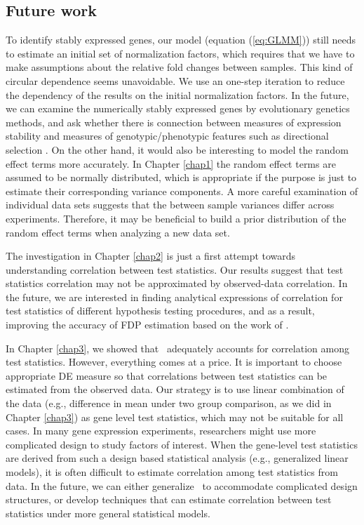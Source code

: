 \subsection{Future work}
To identify stably expressed genes, our model (equation (\ref{eq:GLMM})) still needs to estimate an 
initial set of normalization factors, which requires that we have to make assumptions about the 
relative fold changes between samples. This kind of circular dependence seems unavoidable. We use 
an one-step iteration to reduce the dependency of the results on the initial normalization factors. 
In the future, we can examine the numerically stably expressed genes by evolutionary genetics 
methods, and ask whether there is connection between measures of expression stability and measures 
of genotypic/phenotypic features such as directional selection \citep{sabeti2006positive}.
On the other hand, it would also be interesting to model the random effect terms more accurately. 
In Chapter \ref{chap1} the random effect terms are assumed to be normally distributed, which is 
appropriate 
if the purpose is just to estimate their corresponding variance components. A more careful 
examination of individual data sets suggests that the between sample variances differ across 
experiments. Therefore, it may be beneficial to build a prior distribution of the random effect 
terms when analyzing a new data set. 

The investigation in Chapter \ref{chap2} is just a first attempt towards understanding correlation 
between  test statistics. Our results suggest that test statistics correlation may not be 
approximated by observed-data correlation. In the future, we are interested in finding analytical 
expressions of correlation for test statistics of different hypothesis testing procedures, and as a 
result, improving the accuracy of FDP estimation based on the work of \citet{efron2007correlation}. 

In Chapter \ref{chap3}, we showed that \OurMethod~adequately accounts for correlation among test 
statistics. However, everything comes at a price. 
It is important to choose appropriate DE measure so that correlations between test statistics can 
be estimated from the observed data. Our strategy is to use linear combination of the data (e.g., 
difference in mean under two group comparison, as we did in Chapter \ref{chap3}) as gene level test 
statistics, which may not be suitable for all cases. In many gene expression experiments, 
researchers  might use more complicated design to study factors of interest. When the gene-level 
test statistics are derived from such a design based statistical analysis (e.g., generalized 
linear models), it is often difficult to estimate correlation among test statistics from data. In 
the future, we can either generalize \OurMethod~to accommodate complicated design structures, or 
develop techniques that can estimate correlation between test statistics under 
more general statistical models.  










